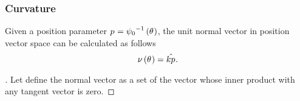 \documentclass[../main.tex]{subfiles}
\begin{document}
\subsubsection{Curvature}
\begin{lemma}\label{M:Normal}
    Given a position parameter $\tensor{p}{}={\psi_0}^{-1}\left(\tensor{\theta}{}\right)$,
    the unit normal vector in position vector space can be calculated as follows
    \begin{equation*}
        \nu\left(\tensor{\theta}{}\right)
        = \hat{k\tensor{p}{}}
        \text{.}
    \end{equation*}
\end{lemma}
\begin{proof}[]
    Let define the normal vector as a set of the vector whose inner product with any tangent vector is zero.


\end{proof}
\end{document}
